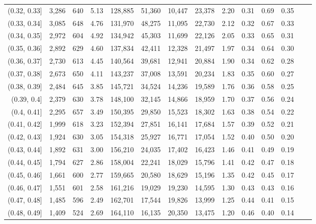 \begin{tabular}{rrrrrrrrrrrrrr}
(0.32, 0.33]   &  3,286 &  640 &    5.13 &  128,885 &   51,360 &  10,447 &  23,378 &  2.20 &  0.31 &  0.69 &      0.35 \\
(0.33, 0.34]   &  3,085 &  648 &    4.76 &  131,970 &   48,275 &  11,095 &  22,730 &  2.12 &  0.32 &  0.67 &      0.33 \\
(0.34, 0.35]   &  2,972 &  604 &    4.92 &  134,942 &   45,303 &  11,699 &  22,126 &  2.05 &  0.33 &  0.65 &      0.31 \\
(0.35, 0.36]   &  2,892 &  629 &    4.60 &  137,834 &   42,411 &  12,328 &  21,497 &  1.97 &  0.34 &  0.64 &      0.30 \\
(0.36, 0.37]   &  2,730 &  613 &    4.45 &  140,564 &   39,681 &  12,941 &  20,884 &  1.90 &  0.34 &  0.62 &      0.28 \\
(0.37, 0.38]   &  2,673 &  650 &    4.11 &  143,237 &   37,008 &  13,591 &  20,234 &  1.83 &  0.35 &  0.60 &      0.27 \\
(0.38, 0.39]   &  2,484 &  645 &    3.85 &  145,721 &   34,524 &  14,236 &  19,589 &  1.76 &  0.36 &  0.58 &      0.25 \\
(0.39, 0.4]    &  2,379 &  630 &    3.78 &  148,100 &   32,145 &  14,866 &  18,959 &  1.70 &  0.37 &  0.56 &      0.24 \\
(0.4, 0.41]    &  2,295 &  657 &    3.49 &  150,395 &   29,850 &  15,523 &  18,302 &  1.63 &  0.38 &  0.54 &      0.22 \\
(0.41, 0.42]   &  1,999 &  618 &    3.23 &  152,394 &   27,851 &  16,141 &  17,684 &  1.57 &  0.39 &  0.52 &      0.21 \\
(0.42, 0.43]   &  1,924 &  630 &    3.05 &  154,318 &   25,927 &  16,771 &  17,054 &  1.52 &  0.40 &  0.50 &      0.20 \\
(0.43, 0.44]   &  1,892 &  631 &    3.00 &  156,210 &   24,035 &  17,402 &  16,423 &  1.46 &  0.41 &  0.49 &      0.19 \\
(0.44, 0.45]   &  1,794 &  627 &    2.86 &  158,004 &   22,241 &  18,029 &  15,796 &  1.41 &  0.42 &  0.47 &      0.18 \\
(0.45, 0.46]   &  1,661 &  600 &    2.77 &  159,665 &   20,580 &  18,629 &  15,196 &  1.35 &  0.42 &  0.45 &      0.17 \\
(0.46, 0.47]   &  1,551 &  601 &    2.58 &  161,216 &   19,029 &  19,230 &  14,595 &  1.30 &  0.43 &  0.43 &      0.16 \\
(0.47, 0.48]   &  1,485 &  596 &    2.49 &  162,701 &   17,544 &  19,826 &  13,999 &  1.25 &  0.44 &  0.41 &      0.15 \\
(0.48, 0.49]   &  1,409 &  524 &    2.69 &  164,110 &   16,135 &  20,350 &  13,475 &  1.20 &  0.46 &  0.40 &      0.14 \\

\end{tabular}
